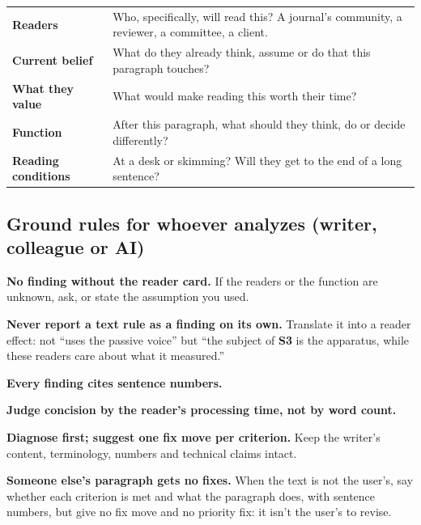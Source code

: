 \documentclass[11pt]{article}
\newcommand{\sref}[1]{{\sffamily\footnotesize\bfseries\color{accent}S#1}}     %
\begin{document}
\renewcommand{\arraystretch}{1.35}
\begin{tabularx}{\linewidth}{@{}>{\sffamily\small\bfseries}p{3.4cm}X@{}}
\toprule
Readers            & Who, specifically, will read this? A journal's community, a reviewer, a committee, a client. \\
Current belief     & What do they already think, assume or do that this paragraph touches? \\
What they value    & What would make reading this worth their time? \\
Function           & After this paragraph, what should they think, do or decide differently? \\
Reading conditions & At a desk or skimming? Will they get to the end of a long sentence? \\
\bottomrule
\end{tabularx}
\renewcommand{\arraystretch}{1}

\subsection{Ground rules for whoever analyzes (writer, colleague or AI)}
\begin{principles}
  \item[G1] \textbf{No finding without the reader card.} If the readers or the function are unknown, ask, or
        state the assumption you used.
  \item[G2] \textbf{Never report a text rule as a finding on its own.} Translate it into a reader effect: not
        ``uses the passive voice'' but ``the subject of \sref{3} is the apparatus, while these readers care about
        what it measured.''
  \item[G3] \textbf{Every finding cites sentence numbers.}
  \item[G4] \textbf{Judge concision by the reader's processing time, not by word count.}
  \item[G5] \textbf{Diagnose first; suggest one fix move per criterion.} Keep the writer's content, terminology,
        numbers and technical claims intact.
  \item[G6] \textbf{Someone else's paragraph gets no fixes.} When the text is not the user's, say whether each
        criterion is met and what the paragraph does, with sentence numbers, but give no fix move and no priority
        fix: it isn't the user's to revise.
\end{principles}

\end{document}
